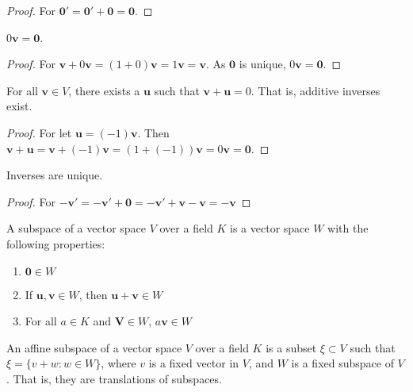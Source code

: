 \documentclass[crop=false,class=article,oneside]{standalone}
\begin{document}
            \begin{proof}
            For $\mathbf{0}'=\mathbf{0}'+\mathbf{0}=\mathbf{0}$.
            \end{proof}
            \begin{theorem}
            $0\mathbf{v} = \mathbf{0}$.
            \end{theorem}
            \begin{proof}
            For $\mathbf{v}+0\mathbf{v} = (1+0)\mathbf{v} = 1\mathbf{v} = \mathbf{v}$. As $\mathbf{0}$ is unique, $0\mathbf{v}=\mathbf{0}$.
            \end{proof}
            \begin{theorem}
            For all $\mathbf{v}\in V$, there exists a $\mathbf{u}$ such that $\mathbf{v}+\mathbf{u}=0$. That is, additive inverses exist.
            \end{theorem}
            \begin{proof}
            For let $\mathbf{u} = (-1)\mathbf{v}$. Then $\mathbf{v}+\mathbf{u} = \mathbf{v}+(-1)\mathbf{v} = (1+(-1))\mathbf{v} = 0\mathbf{v} = \mathbf{0}$.
            \end{proof}
            \begin{theorem}
            Inverses are unique.
            \end{theorem}
            \begin{proof}
            For $-\mathbf{v}'=-\mathbf{v}'+\mathbf{0}=-\mathbf{v}'+\mathbf{v}-\mathbf{v}=- \mathbf{v}$
            \end{proof}
            \begin{definition}
            A subspace of a vector space $V$ over a field $K$ is a vector space $W$ with the following properties:
            \begin{enumerate}
                \item $\mathbf{0} \in W$
                \item If $\mathbf{u,v}\in W$, then $\mathbf{u}+\mathbf{v} \in W$
                \item For all $a\in K$ and $\mathbf{V} \in W$, $a\mathbf{v} \in W$
            \end{enumerate}
            \end{definition}
            \begin{definition}
            An affine subspace of a vector space $V$ over a field $K$ is a subset $\xi\subset V$ such that $\xi = \{v+w:w\in W\}$, where $v$ is a fixed vector in $V$, and $W$ is a fixed subspace of $V$. That is, they are translations of subspaces.
            \end{definition}
\end{document}

